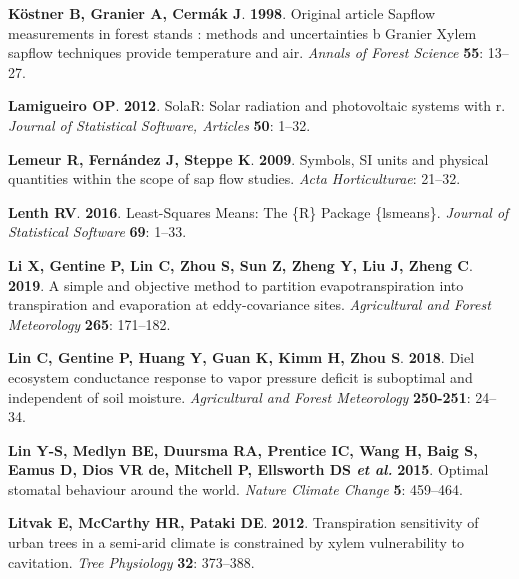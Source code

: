 \documentclass[11pt,twoside]{reedthesis}
\begin{document}
\hypertarget{ref-Kostner1998}{}
\textbf{\textnormal{Köstner B}, \textnormal{Granier A},
\textnormal{Cermák J}}. \textbf{1998}. Original article Sapflow
measurements in forest stands : methods and uncertainties b Granier
Xylem sapflow techniques provide temperature and air. \emph{Annals of
Forest Science} \textbf{55}: 13--27.

\hypertarget{ref-perpinan2012}{}
\textbf{\textnormal{Lamigueiro OP}}. \textbf{2012}. SolaR: Solar
radiation and photovoltaic systems with r. \emph{Journal of Statistical
Software, Articles} \textbf{50}: 1--32.

\hypertarget{ref-lemeur2009}{}
\textbf{\textnormal{Lemeur R}, \textnormal{Fernández J},
\textnormal{Steppe K}}. \textbf{2009}. Symbols, SI units and physical
quantities within the scope of sap flow studies. \emph{Acta
Horticulturae}: 21--32.

\hypertarget{ref-Lenth2016}{}
\textbf{\textnormal{Lenth RV}}. \textbf{2016}. Least-Squares Means: The
\{R\} Package \{lsmeans\}. \emph{Journal of Statistical Software}
\textbf{69}: 1--33.

\hypertarget{ref-li_simple_2019}{}
\textbf{\textnormal{Li X}, \textnormal{Gentine P}, \textnormal{Lin C},
\textnormal{Zhou S}, \textnormal{Sun Z}, \textnormal{Zheng Y},
\textnormal{Liu J}, \textnormal{Zheng C}}. \textbf{2019}. A simple and
objective method to partition evapotranspiration into transpiration and
evaporation at eddy-covariance sites. \emph{Agricultural and Forest
Meteorology} \textbf{265}: 171--182.

\hypertarget{ref-lin_diel_2018}{}
\textbf{\textnormal{Lin C}, \textnormal{Gentine P}, \textnormal{Huang
Y}, \textnormal{Guan K}, \textnormal{Kimm H}, \textnormal{Zhou S}}.
\textbf{2018}. Diel ecosystem conductance response to vapor pressure
deficit is suboptimal and independent of soil moisture.
\emph{Agricultural and Forest Meteorology} \textbf{250-251}: 24--34.

\hypertarget{ref-lin_optimal_2015}{}
\textbf{\textnormal{Lin Y-S}, \textnormal{Medlyn BE},
\textnormal{Duursma RA}, \textnormal{Prentice IC}, \textnormal{Wang H},
\textnormal{Baig S}, \textnormal{Eamus D}, \textnormal{Dios VR de},
\textnormal{Mitchell P}, \textnormal{Ellsworth DS} \emph{et al.}}
\textbf{2015}. Optimal stomatal behaviour around the world. \emph{Nature
Climate Change} \textbf{5}: 459--464.

\hypertarget{ref-litvak_transpiration_2012}{}
\textbf{\textnormal{Litvak E}, \textnormal{McCarthy HR},
\textnormal{Pataki DE}}. \textbf{2012}. Transpiration sensitivity of
urban trees in a semi-arid climate is constrained by xylem vulnerability
to cavitation. \emph{Tree Physiology} \textbf{32}: 373--388.
\end{document}
